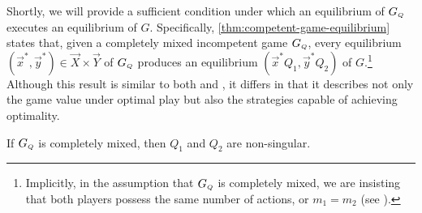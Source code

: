     Shortly, we will provide a sufficient condition under which an equilibrium of $G_\ms{Q}$ executes an equilibrium of $G$.
    Specifically, \autoref{thm:competent-game-equilibrium} states that, given a completely mixed  incompetent game $G_\ms{Q}$, every equilibrium $(\vec{x}^*, \vec{y}^*) \in \vec{X} \times \vec{Y}$ of $G_\ms{Q}$ produces an equilibrium $(\vec{x}^* Q_1, \vec{y}^* Q_2)$ of $G$.\footnote{Implicitly,
        in the assumption that $G_\ms{Q}$ is completely mixed, we are insisting that both players possess the same number of actions, or $m_1 = m_2$ (see \parencite[Theorem 3]{Kaplansky1945}).
    }
    Although this result is similar to both \parencite[Theorem 3.3]{Beck2013} and \parencite[Lemma 4.2]{Beck2007}, it differs in that it describes not only the game value under optimal play but also the strategies capable of achieving optimality.

    \begin{lemma}  \label{lem:non-singular-incompetence-matrices}
        If $G_\ms{Q}$ is completely mixed, then $Q_1$ and $Q_2$ are non-singular.
    \end{lemma}

